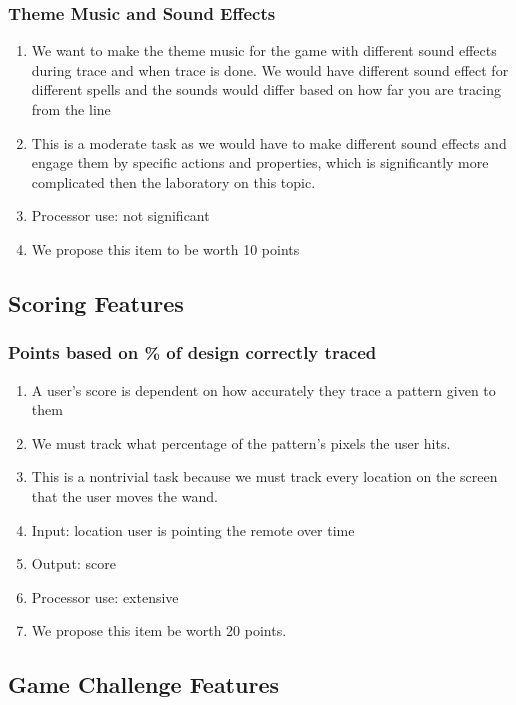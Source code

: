 \documentclass[letterpaper]{article} %
\begin{document}
\subsubsection{Theme Music and Sound Effects}
    \begin{enumerate}
        \item We want to make the theme music for the game with different sound effects during trace and when trace is done. We would have different sound effect for different spells and the sounds would differ based on how far you are tracing from the line
        \item This is a moderate task as we would have to make different sound effects and engage them by specific actions and properties, which is significantly more complicated then the laboratory on this topic.
        \item Processor use: not significant
        \item We propose this item to be worth 10 points
    \end{enumerate}

\subsection{Scoring Features}
\subsubsection{Points based on \% of design correctly traced}
\begin{enumerate}
    \item A user's score is dependent on how accurately they trace a pattern given to them
    \item We must track what percentage of the pattern's pixels the user hits.
    \item This is a nontrivial task because we must track every location on the screen that the user moves the wand.
    \item Input: location user is pointing the remote over time
    \item Output: score
    \item Processor use: extensive
    \item We propose this item be worth 20 points.
\end{enumerate}

\subsection{Game Challenge Features}
\end{document}
